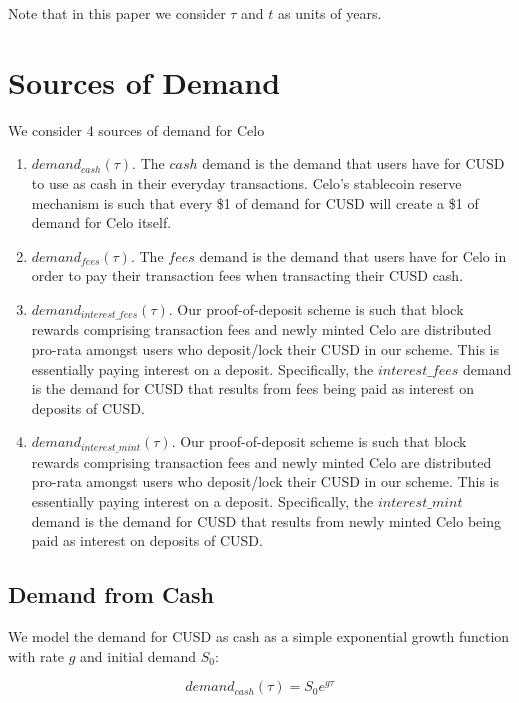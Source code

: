 Note that in this paper we consider $\tau$ and $t$ as units of years. 

\section{Sources of Demand}

We consider 4 sources of demand for Celo

\begin{enumerate}[label=(\roman*)]
	\item $demand_{cash}(\tau)$. The $cash$ demand is the demand that users have for CUSD to use as cash in their everyday transactions. Celo's stablecoin reserve mechanism
	is such that every \$1 of demand for CUSD will create a \$1 of demand for Celo itself. 

	\item $demand_{fees}(\tau)$. The $fees$ demand is the demand that users have for Celo in order to pay their transaction fees when transacting their CUSD cash. 

	\item $demand_{interest\_fees}(\tau)$. Our proof-of-deposit scheme is such that block rewards comprising transaction fees and newly minted Celo are distributed pro-rata 
    amongst users who deposit/lock their CUSD in our scheme. This is essentially paying interest on a deposit. Specifically, the $interest\_fees$ demand is the demand for CUSD that 
    results from fees being paid as interest on deposits of CUSD.
    
	\item $demand_{interest\_mint}(\tau)$. Our proof-of-deposit scheme is such that block rewards comprising transaction fees and newly minted Celo are distributed pro-rata 
    amongst users who deposit/lock their CUSD in our scheme. This is essentially paying interest on a deposit. Specifically, the $interest\_mint$ demand is the demand for CUSD that 
    results from newly minted Celo being paid as interest on deposits of CUSD.

\end{enumerate}

\subsection{Demand from Cash}

We model the demand for CUSD as cash as a simple exponential growth function with rate $g$ and initial demand $S_0$:

\begin{equation}
    demand_{cash}(\tau) = S_0e^{g\tau}
\end{equation}

